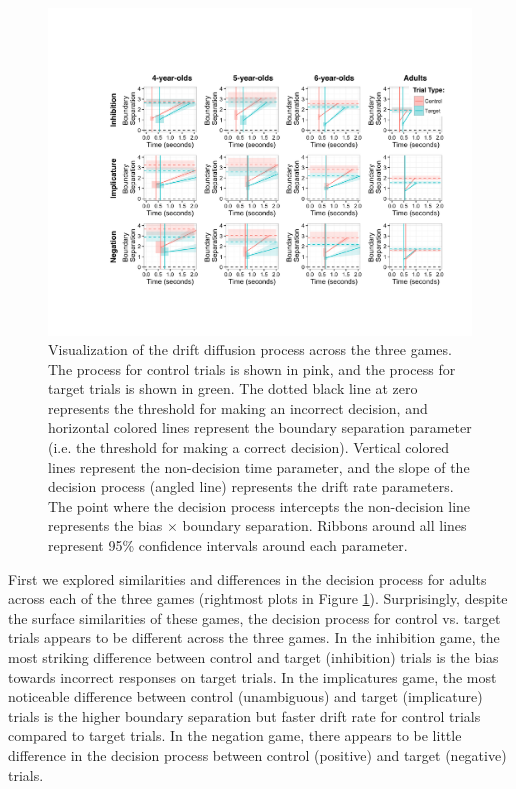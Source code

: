 \documentclass[10pt,letterpaper]{article}
\begin{document}
\begin{figure}[t!]
\begin{center} 
\includegraphics[width=7in]{figures/ddm_vis.pdf}
\caption{\label{fig:ddm} Visualization of the drift diffusion process across the three games.  The process for control trials is shown in pink, and the process for target trials is shown in green.  The dotted black line at zero represents the threshold for making an incorrect decision, and horizontal colored lines represent the boundary separation parameter (i.e. the threshold for making a correct decision).  Vertical colored lines represent the non-decision time parameter, and the slope of the decision process (angled line) represents the drift rate parameters.  The point where the decision process intercepts the non-decision line represents the bias $\times$ boundary separation.  Ribbons around all lines represent 95\% confidence intervals around each parameter.}
\end{center} 
\end{figure}

First we explored similarities and differences in the decision process for adults across each of the three games (rightmost plots in Figure \ref{fig:ddm}). Surprisingly, despite the surface similarities of these games, the decision process for control vs. target trials appears to be different across the three games.  In the inhibition game, the most striking difference between control and target (inhibition) trials is the bias towards incorrect responses on target trials.  In the implicatures game, the most noticeable difference between control (unambiguous) and target (implicature) trials is the higher boundary separation but faster drift rate for control trials compared to target trials.  In the negation game, there appears to be little difference in the decision process between control (positive) and target (negative) trials.
\end{document}
